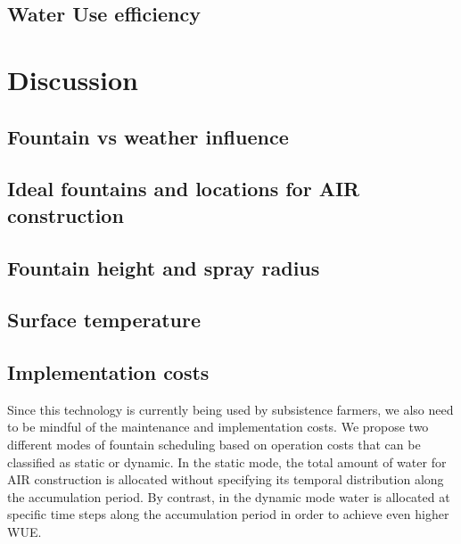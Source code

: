 \documentclass[tc, manuscript]{copernicus}
\begin{document}
\subsection{Water Use efficiency}


\section{Discussion}
\subsection{Fountain vs weather influence}

\subsection{Ideal fountains and locations for AIR construction}

\subsection{Fountain height and spray radius}


\subsection{Surface temperature}

\subsection{Implementation costs}

Since this technology is currently being used by subsistence farmers, we also need to be mindful of the
maintenance and implementation costs. We propose two different modes of fountain scheduling based on operation
costs that can be classified as static or dynamic. In the static mode, the total amount of water
for AIR construction is allocated without specifying its temporal distribution along the accumulation period. By
contrast, in the dynamic mode water is allocated at specific time steps along the accumulation period in
order to achieve even higher WUE.
\end{document}
